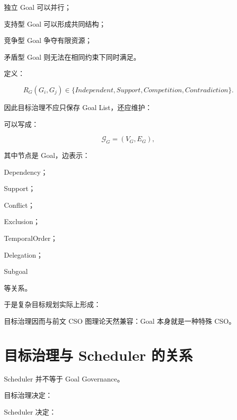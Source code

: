 独立 Goal 可以并行；

支持型 Goal 可以形成共同结构；

竞争型 Goal 争夺有限资源；

矛盾型 Goal 则无法在相同约束下同时满足。

定义：

\[
R_G(G_i,G_j)
\in
\{
Independent,
Support,
Competition,
Contradiction
\}.
\]

因此目标治理不应只保存 Goal List，还应维护：

\begin{statementbox}
\centering
{}
\end{statementbox}

可以写成：

\[
\mathcal G_G
=
(V_G,E_G),
\]

其中节点是 Goal，边表示：

Dependency；

Support；

Conflict；

Exclusion；

TemporalOrder；

Delegation；

Subgoal

等关系。

于是复杂目标规划实际上形成：

\begin{statementbox}
\centering
{}
\end{statementbox}

目标治理因而与前文 CSO 图理论天然兼容：Goal 本身就是一种特殊 CSO。


\section{目标治理与 Scheduler 的关系}

Scheduler 并不等于 Goal Governance。

目标治理决定：

\begin{statementbox}
\centering
{}
\end{statementbox}

Scheduler 决定：

\begin{statementbox}
\centering
{}
\end{statementbox}


